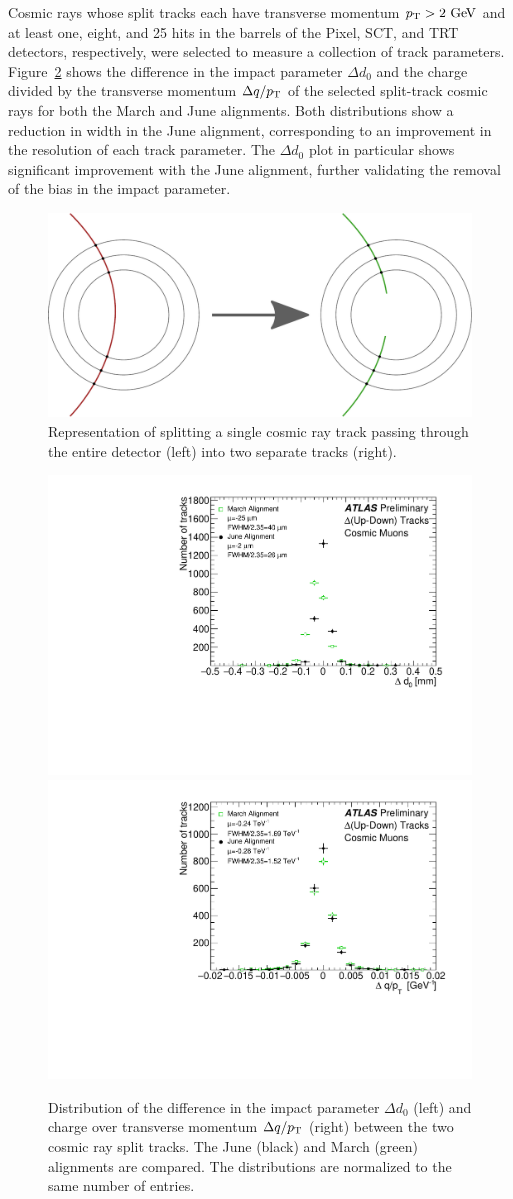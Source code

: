 Cosmic rays whose split tracks each have transverse momentum $\pt > 2\gev$ and at least one, eight, and 25 hits in the barrels of the Pixel, SCT, and TRT detectors, respectively, were selected to measure a collection of track parameters.
Figure~\ref{fig:align_2015_results_cosmic} shows the difference in the impact parameter $\Delta d_0$ and the charge divided by the transverse momentum $\Delta q/p_{\mathrm{T}}$ of the selected split-track cosmic rays for both the March and June alignments.
Both distributions show a reduction in width in the June alignment, corresponding to an improvement in the resolution of each track parameter. 
The $\Delta d_0$ plot in particular shows significant improvement with the June alignment, further validating the removal of the bias in the impact parameter.

\begin{figure}[htbp]
  \centering
  \includegraphics[width=.6\textwidth]{figs/alignment/split-track}
  \caption{Representation of splitting a single cosmic ray track passing through the entire detector (left) into two separate tracks (right).}
  \label{fig:align_2015_results_split_track}
\end{figure}

\begin{figure}[htbp]
  \centering
  \includegraphics[width=.48\textwidth]{figs/alignment/align2015/DELTAD0}
  \includegraphics[width=.48\textwidth]{figs/alignment/align2015/DELTAQOPT}
  \caption{Distribution of the difference in the impact parameter $\Delta d_0$ (left) and charge over transverse momentum $\Delta q/p_{\mathrm{T}}$ (right) between the two cosmic ray split tracks.  The June (black) and March (green) alignments are compared.  The distributions are normalized to the same number of entries.}
  \label{fig:align_2015_results_cosmic}
\end{figure}

